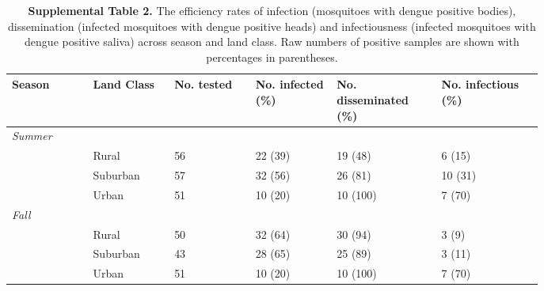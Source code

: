 \documentclass[12pt]{article}
\begin{document}
\begin{landscape}
\clearpage

\begin{table}[h]
\centering
\begin{tabular}{P{0.12\linewidth}P{0.12\linewidth}P{0.12\linewidth}P{0.12\linewidth}P{0.15\linewidth}P{0.15\linewidth}}
\hline
\textbf{Season} & \textbf{Land Class} & \textbf{No. tested} & \textbf{No. infected (\%)}  & \textbf{No. disseminated (\%)} & \textbf{No. infectious (\%)} \\
\hline
\hline
\textit{Summer} &   &   &   &   \\
     & Rural & 56 & 22 (39) & 19 (48) & 6 (15) \\
   & Suburban & 57 & 32 (56) & 26 (81) & 10 (31) \\
   & Urban & 51 & 10 (20) & 10 (100) & 7 (70) \\

\textit{Fall} &   &   &   &   \\
     & Rural & 50 & 32 (64) & 30 (94) & 3 (9) \\
   & Suburban & 43 & 28 (65) & 25 (89) & 3 (11) \\
   & Urban & 51 & 10 (20) & 10 (100) & 7 (70) \\
\hline
\end{tabular}
\caption{\textbf{Supplemental Table 2.} The efficiency rates of infection (mosquitoes with dengue positive bodies), dissemination (infected mosquitoes with dengue positive heads) and infectiousness (infected mosquitoes with dengue positive saliva) across season and land class. Raw numbers of positive samples are shown with percentages in parentheses.}
\end{table}

\end{landscape}
\end{document}
